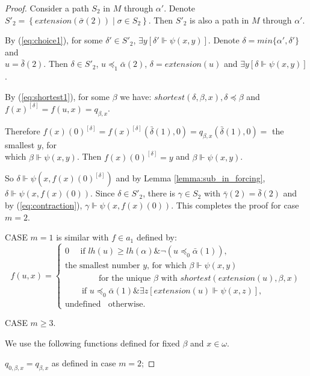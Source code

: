 \documentclass{asl}
\theoremstyle{definition}
\begin{document}
\begin{proof}
Consider a path $S_2$ in $M$ through $\alpha'$. Denote $S'_2=\left\lbrace extension(\bar{\sigma}(2))\mid \sigma\in S_2\right\rbrace$. Then $S'_2$ is also a path in $M$ through $\alpha'$. 
\smallskip

By (\ref{eq:choice1}), for some $\delta'\in S'_2$, $\exists y\left[\delta' \Vdash \psi(x,y) \right] $. Denote $\delta=min\{\alpha', \delta'\}$ and 
\smallskip
\\$u=\bar{\delta}(2)$. 
Then $\delta \in S'_2$,  $u\preccurlyeq_1 \bar{\alpha}(2)$, $\delta=extension(u)$ and $\exists y 
\left[\delta\Vdash \psi(x,y) \right]$. 
\medskip

By (\ref{eq:shortest1}), for some $\beta$ we have: $shortest(\delta,\beta,x),\delta\preccurlyeq\beta$ and $f(x)^{[\delta]}=f(u,x)=q_{\beta, x}$. 

Therefore $f(x)(0)^{[\delta]}=f(x)^{[\delta]}(\bar{\delta}(1),0)=q_{\beta, x}(\bar{\delta}(1),0)=$ the smallest $y$, for 
\medskip
\\
which $\beta \Vdash \psi(x,y)$. Then $f(x)(0)^{[\delta]}=y$ and $\beta \Vdash \psi(x,y)$. 
\medskip

So $\delta \Vdash \psi(x,f(x)(0)^{[\delta]})$ and by Lemma \ref{lemma:sub_in_forcing}, 
$\delta \Vdash \psi(x,f(x)(0))$. Since $\delta \in S'_2$, there is $\gamma \in S_2$ with $\bar{\gamma}(2)=\bar{\delta}(2)$ and by (\ref{eq:contraction}), $\gamma\Vdash \psi(x,f(x)(0))$. This completes the proof for case $m=2$.
\smallskip

CASE $m=1$ is similar with $f\in a_1$ defined by:
\begin{displaymath}
f(u,x)=
\begin{cases}
0 \quad \text{ if } lh(u)\geqslant lh(\alpha) \& \neg(u\preccurlyeq_0\bar{\alpha}(1)),\\
\text{the smallest number }y\text{, for which }\beta\Vdash \psi(x,y)\\
\qquad \qquad\text{for the unique } \beta \text{ with }shortest(extension(u),\beta,x) \\
\qquad \text{if } u\preccurlyeq_0\bar{\alpha}(1) \& \exists z\left[extension(u)\Vdash \psi(x,z)\right],\\ 
\text{undefined } \: \text{ otherwise.}
\end{cases}
\end{displaymath} 

CASE $m\geqslant 3$. 

We use the following functions defined for fixed $\beta$ and $x\in \omega$.

$q_{0,\beta, x}=q_{\beta, x}$ as defined in case $m=2$; 


\end{proof}
\end{document}
